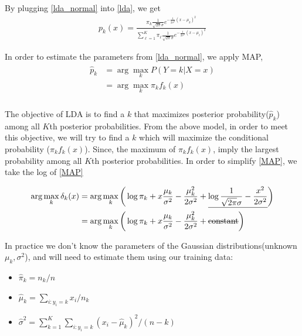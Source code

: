     \documentclass[12pt,fleqn,a4paper]{article}%
\theoremstyle{definition}
\theoremstyle{plain}
\numberwithin{equation}{section}
\begin{document}
By plugging \eqref{lda_normal} into \eqref{lda}, we get
\begin{gather}
p_{k}(x) = \frac{\pi_{k} \frac{1}{\sqrt{2\pi}\sigma}e^{-\frac{1}{2\sigma^{2}}(x-\mu_{k})^{2}}}{\sum\limits_{\ell=1}^{K}\pi_{\ell} \frac{1}{\sqrt{2\pi}\sigma}e^{-\frac{1}{2\sigma^{2}}(x-\mu_{\ell})^{2}}}
\end{gather}

In order to estimate the parameters from \eqref{lda_normal}, we apply MAP,
\begin{align}
\begin{split}
\hat{p}_{k} &= \arg\max_{k} P(Y=k|X=x) \\
		    &= \arg\max_{k} \pi_{k}f_{k}(x)\\
\end{split}
\label{MAP}
\end{align}

The objective of LDA is to find a $k$ that maximizes posterior probability($\hat{p}_{k}$) among all $K$th posterior probabilities. 
From the above model, in order to meet this objective, we will try to find a $k$ which will maximize the conditional probability ($\pi_{k}f_{k}(x)$).
Since, the maximum of $\pi_{k}f_{k}(x)$, imply the largest probability among all $K$th posterior probabilities.
In order to simplify \eqref{MAP}, we take the log of \eqref{MAP}

\begin{align}
\begin{split}
\arg\max_{k}  \delta_{k}(x) &= \arg\max_{k} \bigg( \log \pi_{k} + x \frac{\mu_{k}}{\sigma^{2}}-\frac{\mu_{k}^{2}}{2\sigma^{2}}+ \underline{\log \frac{1}{\sqrt{2\pi}\sigma}-\frac{x^{2}}{2\sigma^{2}}} \bigg)\\
 						    &= \arg\max_{k} \bigg( \log \pi_{k} + x \frac{\mu_{k}}{\sigma^{2}}-\frac{\mu_{k}^{2}}{2\sigma^{2}}+ \text{\sout{constant}} \bigg)
\end{split}
\end{align}

In practice we don't know the parameters of the Gaussian distributions(unknown $\mu_{k}, \sigma^{2}$), and will need to estimate them using our training data:

\begin{itemize}
\item $\hat{\pi}_{k} = n_{k}/n$
\item $\hat{\mu}_{k}=\sum\limits_{i:y_{i}=k}x_{i}/n_{k}$
\item $\hat{\sigma}^{2} = \sum\limits_{k=1}^{K}\sum\limits_{i:y_{i}=k}(x_{i}-\hat{\mu}_{k})^{2}/(n-k)$
\end{itemize}
\end{document}
